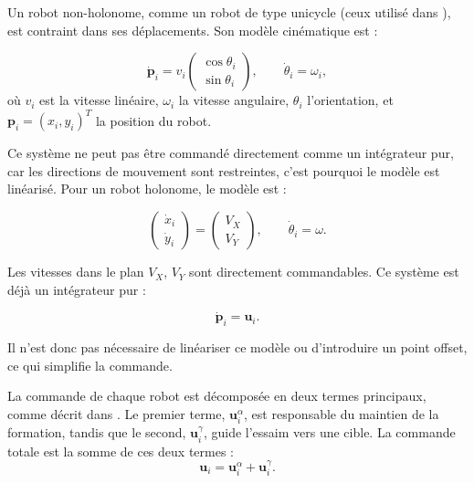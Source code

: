 Un robot non-holonome, comme un robot de type unicycle (ceux utilisé dans \cite{koung_consensus-based_2020}), est contraint dans ses déplacements. Son modèle cinématique est :

\begin{equation}
\dot{\mathbf{p}}_i = v_i \begin{pmatrix}\cos\theta_i \\ \sin\theta_i\end{pmatrix}, \qquad \dot{\theta}_i = \omega_i,
\end{equation}
où $v_i$ est la vitesse linéaire, $\omega_i$ la vitesse angulaire, $\theta_i$ l'orientation, et $\mathbf{p}_i = (x_i, y_i)^T$ la position du robot.

Ce système ne peut pas être commandé directement comme un int\'egrateur pur, car les directions de mouvement sont restreintes, c'est pourquoi le modèle est linéarisé.
Pour un robot holonome, le modèle est :

\begin{equation}
\begin{pmatrix} \dot{x}_i \\ \dot{y}_i \end{pmatrix} = \begin{pmatrix} V_X \\ V_Y \end{pmatrix}, \qquad \dot{\theta}_i = \omega.
\end{equation}

Les vitesses dans le plan $V_X$, $V_Y$ sont directement commandables. Ce système est déjà un int\'egrateur pur :

\begin{equation}
\dot{\mathbf{p}}_i = \mathbf{u}_i.
\end{equation}

Il n’est donc pas nécessaire de linéariser ce modèle ou d’introduire un point offset, ce qui simplifie la commande.

La commande de chaque robot est décomposée en deux termes principaux, comme décrit dans \cite{koung_consensus-based_2020}. Le premier terme, $\mathbf{u}_i^{\alpha}$, est responsable du maintien de la formation, tandis que le second, $\mathbf{u}_i^{\gamma}$, guide l'essaim vers une cible. La commande totale est la somme de ces deux termes :
\begin{equation}
    \mathbf{u}_i = \mathbf{u}_i^{\alpha} + \mathbf{u}_i^{\gamma}.
\end{equation}

